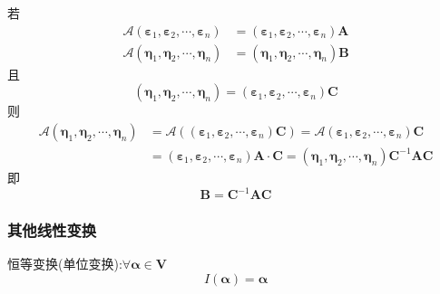 \documentclass{article}
\begin{document}
				若
				$$
				\begin{aligned}
					\mathscr{A}\left(\boldsymbol \varepsilon_{1}, \boldsymbol \varepsilon_{2}, \cdots, \boldsymbol \varepsilon_{n}\right) &=\left(\boldsymbol \varepsilon_{1}, \boldsymbol \varepsilon_{2}, \cdots, \boldsymbol \varepsilon_{n}\right) \boldsymbol{A} \\
					\mathscr{A}\left(\boldsymbol{\eta}_{1}, \boldsymbol{\eta}_{2}, \cdots, \boldsymbol{\eta}_{n}\right) &=\left(\boldsymbol{\eta}_{1}, \boldsymbol{\eta}_{2}, \cdots, \boldsymbol{\eta}_{n}\right) \boldsymbol{B}
				\end{aligned}
				$$
				且
				$$
				\left(\boldsymbol \eta_{1}, \boldsymbol \eta_{2}, \cdots, \boldsymbol \eta_{n}\right)=\left(\boldsymbol \varepsilon_{1}, \boldsymbol \varepsilon_{2}, \cdots, \boldsymbol \varepsilon_{n}\right)\boldsymbol C
				$$
				则
				$$
				\begin{aligned}
					\mathscr{A}\left(\boldsymbol{\eta}_{1}, \boldsymbol{\eta}_{2}, \cdots, \boldsymbol{\eta}_{n}\right) &=\mathscr{A}\left(\left(\boldsymbol \varepsilon_{1}, \boldsymbol \varepsilon_{2}, \cdots, \boldsymbol \varepsilon_{n}\right) \boldsymbol{C}\right)=\mathscr{A}\left(\boldsymbol \varepsilon_{1}, \boldsymbol \varepsilon_{2}, \cdots, \boldsymbol \varepsilon_{n}\right) \boldsymbol{C} \\
					&=\left(\boldsymbol \varepsilon_{1}, \boldsymbol \varepsilon_{2}, \cdots, \boldsymbol \varepsilon_{n}\right) \boldsymbol{A} \cdot \boldsymbol{C}=\left(\boldsymbol{\eta}_{1}, \boldsymbol{\eta}_{2}, \cdots, \boldsymbol{\eta}_{n}\right) \boldsymbol{C}^{-1} \boldsymbol{A} \boldsymbol{C}
				\end{aligned}
				$$
				即
				$$
				\boldsymbol B=\boldsymbol C^{-1} \boldsymbol A \boldsymbol C
				$$
			\subsubsection{其他线性变换}
				恒等变换(单位变换):$\forall\boldsymbol \alpha \in \boldsymbol V$
				$$
				I(\boldsymbol{\alpha})=\boldsymbol{\alpha}
				$$
\end{document}
